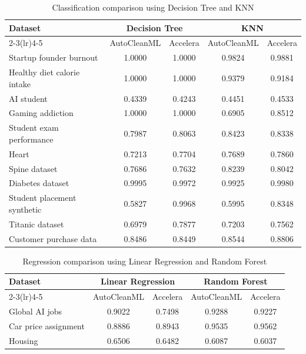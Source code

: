 \documentclass[12pt,a4paper,oneside]{report}
\begin{document}
\begin{table}[H]
\centering
\small
\caption{Classification comparison using Decision Tree and KNN}
\label{tab:classification-dt-knn-autoclean-accelera}
\begin{tabular}{p{}cccc}
\toprule
Dataset & \multicolumn{2}{c}{Decision Tree} & \multicolumn{2}{c}{KNN} \\
\cmidrule(lr){2-3}\cmidrule(lr){4-5}
 & AutoCleanML & Accelera & AutoCleanML & Accelera \\
\midrule
Startup founder burnout & 1.0000 & 1.0000 & 0.9824 & 0.9881 \\
Healthy diet calorie intake & 1.0000 & 1.0000 & 0.9379 & 0.9184 \\
AI student & 0.4339 & 0.4243 & 0.4451 & 0.4533 \\
Gaming addiction & 1.0000 & 1.0000 & 0.6905 & 0.8512 \\
Student exam performance & 0.7987 & 0.8063 & 0.8423 & 0.8338 \\
Heart & 0.7213 & 0.7704 & 0.7689 & 0.7860 \\
Spine dataset & 0.7686 & 0.7632 & 0.8239 & 0.8042 \\
Diabetes dataset & 0.9995 & 0.9972 & 0.9925 & 0.9980 \\
Student placement synthetic & 0.5827 & 0.9968 & 0.5995 & 0.8348 \\
Titanic dataset & 0.6979 & 0.7877 & 0.7203 & 0.7562 \\
Customer purchase data & 0.8486 & 0.8449 & 0.8544 & 0.8806 \\
\bottomrule
\end{tabular}
\end{table}

\begin{table}[H]
\centering
\small
\caption{Regression comparison using Linear Regression and Random Forest}
\label{tab:regression-lr-rf-autoclean-accelera}
\begin{tabular}{p{}cccc}
\toprule
Dataset & \multicolumn{2}{c}{Linear Regression} & \multicolumn{2}{c}{Random Forest} \\
\cmidrule(lr){2-3}\cmidrule(lr){4-5}
 & AutoCleanML & Accelera & AutoCleanML & Accelera \\
\midrule
Global AI jobs & 0.9022 & 0.7498 & 0.9288 & 0.9227 \\
Car price assignment & 0.8886 & 0.8943 & 0.9535 & 0.9562 \\
Housing & 0.6506 & 0.6482 & 0.6087 & 0.6037 \\
\bottomrule
\end{tabular}
\end{table}
\end{document}
